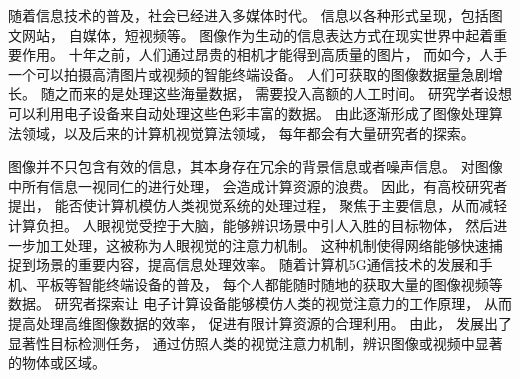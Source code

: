



%
%
%
%
%
%
%
%
%
%
%





\label{chap:part1}


随着信息技术的普及，社会已经进入多媒体时代。
信息以各种形式呈现，包括图文网站，
自媒体，短视频等。
图像作为生动的信息表达方式在现实世界中起着重要作用。
十年之前，人们通过昂贵的相机才能得到高质量的图片，
而如今，人手一个可以拍摄高清图片或视频的智能终端设备。
人们可获取的图像数据量急剧增长。
随之而来的是处理这些海量数据，
需要投入高额的人工时间。
研究学者设想可以利用电子设备来自动处理这些色彩丰富的数据。
由此逐渐形成了图像处理算法领域，以及后来的计算机视觉算法领域，
每年都会有大量研究者的探索。




图像并不只包含有效的信息，其本身存在冗余的背景信息或者噪声信息。
对图像中所有信息一视同仁的进行处理，
会造成计算资源的浪费。
因此，有高校研究者提出，
能否使计算机模仿人类视觉系统的处理过程，
聚焦于主要信息，从而减轻计算负担。
人眼视觉受控于大脑，能够辨识场景中引人入胜的目标物体，
然后进一步加工处理，这被称为人眼视觉的注意力机制。
这种机制使得网络能够快速捕捉到场景的重要内容，提高信息处理效率。
随着计算机5G通信技术的发展和手机、平板等智能终端设备的普及，
每个人都能随时随地的获取大量的图像视频等数据。
研究者探索让
电子计算设备能够模仿人类的视觉注意力的工作原理，
从而提高处理高维图像数据的效率，
促进有限计算资源的合理利用。
由此，
发展出了显著性目标检测任务，
通过仿照人类的视觉注意力机制，辨识图像或视频中显著的物体或区域。



